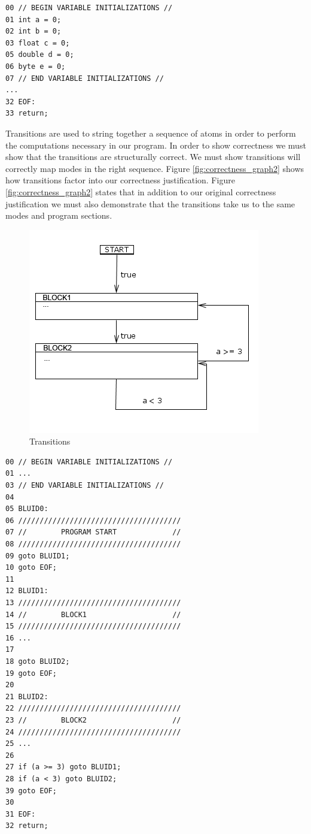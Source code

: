 \begin{lstlisting}[frame=single]
00 // BEGIN VARIABLE INITIALIZATIONS //
01 int a = 0;
02 int b = 0;
03 float c = 0;
05 double d = 0;
06 byte e = 0;
07 // END VARIABLE INITIALIZATIONS //
...
32 EOF:
33 return;
\end{lstlisting}

Transitions are used to string together a sequence of atoms in order to perform the computations 
necessary in our program. In order to show correctness we must show that the transitions are 
structurally correct. We must show transitions will correctly map modes in the right sequence. 
Figure \ref{fig:correctness_graph2} shows how transitions factor into our correctness justification.
Figure \ref{fig:correctness_graph2} states that in addition to our original correctness justification we
must also demonstrate that the transitions take us to the same modes and program sections.

\begin{figure}[h]
	\centering
	\includegraphics[width=\imgmedphoto]{./images/correctness_ex_transition.png}
	\caption{Transitions}
	\label{fig:correctness_ex_transition}
\end{figure}

\begin{lstlisting}[frame=single]
00 // BEGIN VARIABLE INITIALIZATIONS //
01 ...
03 // END VARIABLE INITIALIZATIONS //
04
05 BLUID0:
06 //////////////////////////////////////
07 //        PROGRAM START             //
08 //////////////////////////////////////
09 goto BLUID1;
10 goto EOF;
11
12 BLUID1:
13 //////////////////////////////////////
14 //        BLOCK1                    //
15 //////////////////////////////////////
16 ...
17 
18 goto BLUID2;
19 goto EOF;
20
21 BLUID2:
22 //////////////////////////////////////
23 //        BLOCK2                    //
24 //////////////////////////////////////
25 ...
26
27 if (a >= 3) goto BLUID1;
28 if (a < 3) goto BLUID2;
39 goto EOF;
30
31 EOF:
32 return;
\end{lstlisting}

